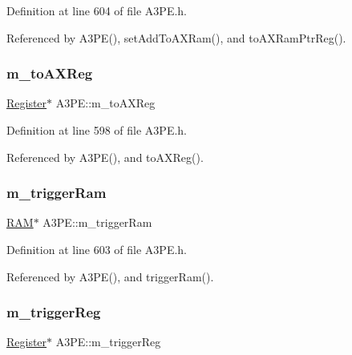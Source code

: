 Definition at line 604 of file A3\+P\+E.\+h.



Referenced by A3\+P\+E(), set\+Add\+To\+A\+X\+Ram(), and to\+A\+X\+Ram\+Ptr\+Reg().

\mbox{\label{classA3PE_abe8eb76e3c0d967403726143deb1b70f}} 
\subsubsection{\texorpdfstring{m\+\_\+to\+A\+X\+Reg}{m\_toAXReg}}
{\footnotesize\ttfamily \hyperlink{classRegister}{Register}$\ast$ A3\+P\+E\+::m\+\_\+to\+A\+X\+Reg\hspace{0.3cm}{\ttfamily [private]}}



Definition at line 598 of file A3\+P\+E.\+h.



Referenced by A3\+P\+E(), and to\+A\+X\+Reg().

\mbox{\label{classA3PE_a2b40e3937f0aa008ec7073acc5029fcc}} 
\subsubsection{\texorpdfstring{m\+\_\+trigger\+Ram}{m\_triggerRam}}
{\footnotesize\ttfamily \hyperlink{classRAM}{R\+AM}$\ast$ A3\+P\+E\+::m\+\_\+trigger\+Ram\hspace{0.3cm}{\ttfamily [private]}}



Definition at line 603 of file A3\+P\+E.\+h.



Referenced by A3\+P\+E(), and trigger\+Ram().

\mbox{\label{classA3PE_a750158ae488121ab7969452f061e678c}} 
\subsubsection{\texorpdfstring{m\+\_\+trigger\+Reg}{m\_triggerReg}}
{\footnotesize\ttfamily \hyperlink{classRegister}{Register}$\ast$ A3\+P\+E\+::m\+\_\+trigger\+Reg\hspace{0.3cm}{\ttfamily [private]}}



